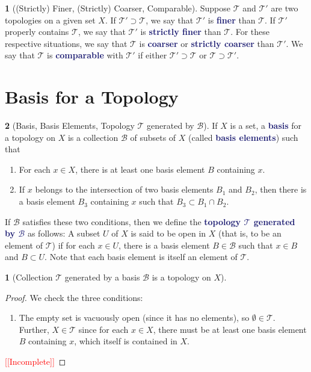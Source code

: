 \documentclass[12pt]{article}
\newcommand{\navy}[1]{\textcolor{MidnightBlue}{\bf #1}}
\theoremstyle{plain}
\newtheorem{theorem}{\color{ForestGreen}{\textbf{Theorem}}}[section]
\theoremstyle{definition}
\newtheorem{definition}{\color{MidnightBlue}{\textbf{Definition}}}[section]
\newcommand{\1}{\mathbbm 1}
\newcommand{\tT}{\mathcal T}
\newcommand{\bB}{\mathcal B}
\begin{document}
\begin{definition}[(Strictly) Finer, (Strictly) Coarser, Comparable]
	Suppose $\tT$ and $\tT'$ are two topologies on a given set $X$. If $\tT' \supset \tT$, we say that $\tT'$ is \navy{finer} than $\tT$. If $\tT'$ properly contains $\tT$, we say that $\tT'$ is \navy{strictly finer} than $\tT$. For these respective situations, we say that $\tT$ is \navy{coarser} or \navy{strictly coarser} than $\tT'$. We say that $\tT$ is \navy{comparable} with $\tT'$ if either $\tT' \supset \tT$ or $\tT \supset \tT'$.
\end{definition}


\section{Basis for a Topology}

\begin{definition}[Basis, Basis Elements, Topology $\tT$ generated by $\bB$]
	If $X$ is a set, a \navy{basis} for a topology on $X$ is a collection $\bB$ of subsets of $X$ (called \navy{basis elements}) such that
	\begin{enumerate}
		\item For each $x \in X$, there is at least one basis element $B$ containing $x$.
		\item If $x$ belongs to the intersection of two basis elements $B_1$ and $B_2$, then there is a basis element $B_3$ containing $x$ such that $B_3 \subset B_1 \cap B_2$.
	\end{enumerate}
	If $\bB$ satisfies these two conditions, then we define the \navy{topology $\tT$ generated by $\bB$} as follows: A subset $U$ of $X$ is said to be open in $X$ (that is, to be an element of $\tT$) if for each $x \in U$, there is a basis element $B \in \bB$ such that $x \in B$ and $B \subset U$. Note that each basis element is itself an element of $\tT$.
\end{definition}

\begin{theorem}[Collection $\tT$ generated by a basis $\bB$ is a topology on $X$]
\end{theorem}
\begin{proof}
	We check the three conditions:
	\begin{enumerate}
		\item The empty set is vacuously open (since it has no elements), so $\emptyset \in \tT$. Further, $X \in \tT$ since for each $x \in X$, there must be at least one basis element $B$ containing $x$, which itself is contained in $X$. 
	\end{enumerate}
	\textcolor{red}{[[Incomplete]]}
\end{proof}
\end{document}
